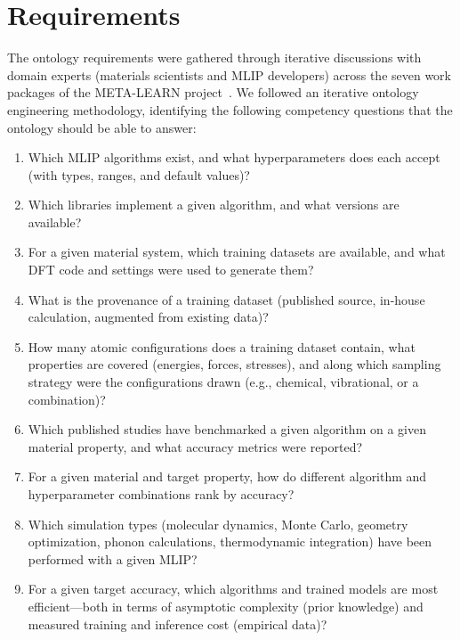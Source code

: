 \section{Requirements}
\label{sec:requirements}

The ontology requirements were gathered through iterative discussions with
domain experts (materials scientists and MLIP developers) across the seven work
packages of the META-LEARN project~\cite{grabowski2024metalearnerc}. We
followed an iterative ontology engineering methodology, identifying the
following competency questions that the ontology should be able to answer:

\begin{enumerate}
\item[CQ1.] Which MLIP algorithms exist, and what hyperparameters does each
  accept (with types, ranges, and default values)?
\item[CQ2.] Which libraries implement a given algorithm, and what versions
  are available?
\item[CQ3.] For a given material system, which training datasets are available,
  and what DFT code and settings were used to generate them?
\item[CQ4.] What is the provenance of a training dataset (published source,
  in-house calculation, augmented from existing data)?
\item[CQ5.] How many atomic configurations does a training dataset contain,
  what properties are covered (energies, forces, stresses), and along which
  sampling strategy were the configurations drawn (e.g., chemical, vibrational,
  or a combination)?
\item[CQ6.] Which published studies have benchmarked a given algorithm on a
  given material property, and what accuracy metrics were reported?
\item[CQ7.] For a given material and target property, how do different
  algorithm and hyperparameter combinations rank by accuracy?
\item[CQ8.] Which simulation types (molecular dynamics, Monte Carlo, geometry
  optimization, phonon calculations, thermodynamic integration) have been
  performed with a given MLIP?
\item[CQ9.] For a given target accuracy, which algorithms and trained
  models are most efficient---both in terms of asymptotic complexity
  (prior knowledge) and measured training and inference cost
  (empirical data)?
\end{enumerate}

